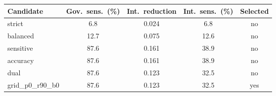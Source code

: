 \begin{tabular}{@{}lcccc@{}}
\toprule
Candidate & Gov.\ sens.\ (\%) & Int.\ reduction & Int.\ sens.\ (\%) & Selected \\
\midrule
strict & 6.8 & 0.024 & 6.8 & no \\
balanced & 12.7 & 0.075 & 12.6 & no \\
sensitive & 87.6 & 0.161 & 38.9 & no \\
accuracy & 87.6 & 0.161 & 38.9 & no \\
dual & 87.6 & 0.123 & 32.5 & no \\
grid\_p0\_r90\_b0 & 87.6 & 0.123 & 32.5 & yes \\
\bottomrule
\end{tabular}
